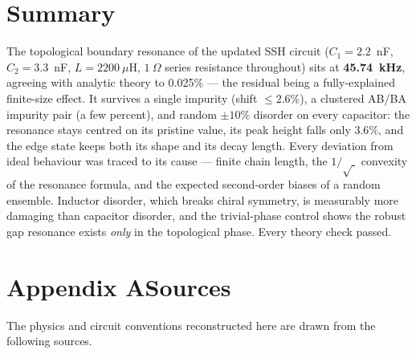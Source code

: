 \documentclass[11pt]{article}
\begin{document}
\clearpage
\section*{Summary}

The topological boundary resonance of the updated SSH circuit
($C_1=2.2$~nF, $C_2=3.3$~nF, $L=2200\ \mu$H, $1\ \Omega$ series resistance
throughout) sits at \textbf{45.74~kHz}, agreeing with analytic theory to
0.025\% --- the residual being a fully-explained finite-size effect. It
survives a single impurity (shift $\le2.6\%$), a clustered AB/BA impurity
pair (a few percent), and random $\pm10\%$ disorder on every capacitor: the
resonance stays centred on its pristine value, its peak height falls only
$3.6\%$, and the edge state keeps both its shape and its decay length.
Every deviation from ideal behaviour was traced to its cause --- finite
chain length, the $1/\sqrt{\;}$ convexity of the resonance formula, and the
expected second-order biases of a random ensemble. Inductor disorder, which
breaks chiral symmetry, is measurably more damaging than capacitor
disorder, and the trivial-phase control shows the robust gap resonance
exists \emph{only} in the topological phase. Every theory check passed.

\clearpage
\section*{Appendix A\quad Sources}
\small
The physics and circuit conventions reconstructed here are drawn from the
following sources.
\end{document}

